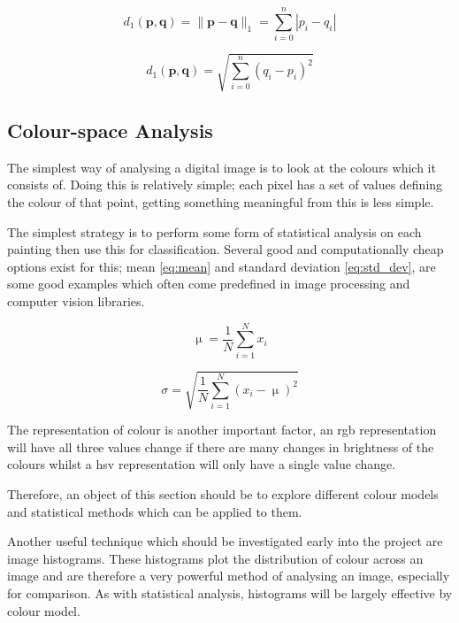 \begin{equation}\label{eq:manhattan_distance}
d_1(\mathbf{p},\mathbf{q}) = \|\mathbf{p}-\mathbf{q}\|_1 = \sum^{n}_{i=0}{|p_i-q_i|}
\end{equation}

\begin{equation}\label{eq:euclidean_distance}
d_1(\mathbf{p}, \mathbf{q}) = \sqrt{\sum^{n}_{i=0}({q_i-p_i})^2}
\end{equation}

\subsection{Colour-space Analysis}
The simplest way of analysing a digital image is to look at the colours which it consists of.
Doing this is relatively simple; each pixel has a set of values defining the colour of that point,
getting something meaningful from this is less simple.

The simplest strategy is to perform some form of statistical analysis on each painting then use
this for classification. Several good and computationally cheap options exist for this; 
mean \eqref{eq:mean} and standard deviation \eqref{eq:std_dev}, are some good
examples which often come predefined in image processing and computer vision libraries.

\begin{equation}\label{eq:mean}
\upmu = \frac{1}{N}\sum_{i=1}^{N}x_i
\end{equation}

\begin{equation}\label{eq:std_dev}
\sigma = \sqrt{\frac{1}{N}\sum_{i=1}^{N}(x_i - \upmu)^2}
\end{equation}

The representation of colour is another important factor, an \gls{rgb} representation will have all 
three values change if there are many changes in brightness of the colours whilst a \gls{hsv} 
representation will only have a single value change.

Therefore, an object of this section should be to explore different colour models and statistical
methods which can be applied to them.

Another useful technique which should be investigated early into the project are image histograms.
These histograms plot the distribution of colour across an image and are therefore a very powerful
method of analysing an image, especially for comparison. As with statistical analysis, histograms
will be largely effective by colour model.

